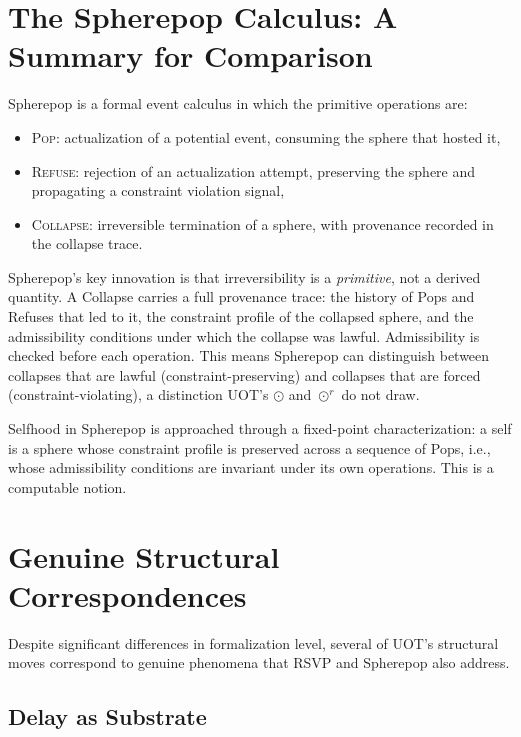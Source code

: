 \documentclass[12pt, oneside]{article}
\theoremstyle{plain-remark}
\newcommand{\ucollapse}{\odot}
\newcommand{\urcollapse}{\odot^r}
\begin{document}
\section{The Spherepop Calculus: A Summary for Comparison}

Spherepop is a formal event calculus in which the primitive operations are:

\begin{itemize}
  \item \textsc{Pop}: actualization of a potential event, consuming the sphere that
        hosted it,
  \item \textsc{Refuse}: rejection of an actualization attempt, preserving the sphere
        and propagating a constraint violation signal,
  \item \textsc{Collapse}: irreversible termination of a sphere, with provenance recorded
        in the collapse trace.
\end{itemize}

Spherepop's key innovation is that irreversibility is a \emph{primitive}, not a derived
quantity. A Collapse carries a full provenance trace: the history of Pops and Refuses that
led to it, the constraint profile of the collapsed sphere, and the admissibility conditions
under which the collapse was lawful. Admissibility is checked before each operation.
This means Spherepop can distinguish between collapses that are lawful
(constraint-preserving) and collapses that are forced (constraint-violating), a
distinction UOT's $\ucollapse$ and $\urcollapse$ do not draw.

Selfhood in Spherepop is approached through a fixed-point characterization: a self is
a sphere whose constraint profile is preserved across a sequence of Pops, i.e., whose
admissibility conditions are invariant under its own operations. This is a computable
notion.


\section{Genuine Structural Correspondences}

Despite significant differences in formalization level, several of UOT's structural moves
correspond to genuine phenomena that RSVP and Spherepop also address.

\subsection{Delay as Substrate}
\end{document}
